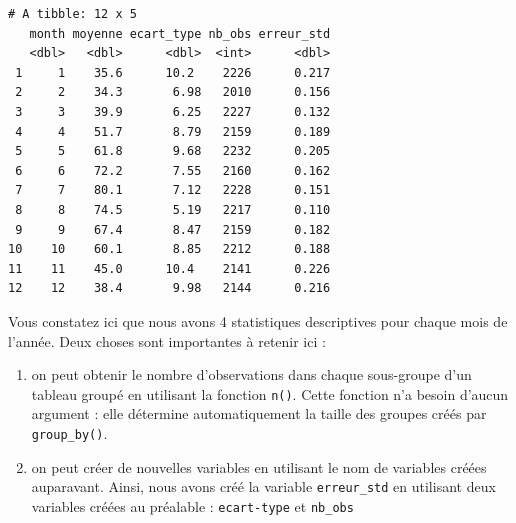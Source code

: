 \documentclass[a4paperpaper,]{article}
\newenvironment{Shaded}{\begin{snugshade}}{\end{snugshade}}
\newcommand{\DataTypeTok}[1]{\textcolor[rgb]{0.00,0.34,0.68}{#1}}
\newcommand{\KeywordTok}[1]{\textcolor[rgb]{0.12,0.11,0.11}{\textbf{#1}}}
\newcommand{\NormalTok}[1]{\textcolor[rgb]{0.12,0.11,0.11}{#1}}
\newcommand{\OperatorTok}[1]{\textcolor[rgb]{0.12,0.11,0.11}{#1}}
\newcommand{\OtherTok}[1]{\textcolor[rgb]{0.00,0.43,0.16}{#1}}
\newcommand{\StringTok}[1]{\textcolor[rgb]{0.75,0.01,0.01}{#1}}
\providecommand{\tightlist}{%
  \setlength{\itemsep}{0pt}\setlength{\parskip}{0pt}}
\begin{document}
\begin{Shaded}
\end{Shaded}

\begin{verbatim}
# A tibble: 12 x 5
   month moyenne ecart_type nb_obs erreur_std
   <dbl>   <dbl>      <dbl>  <int>      <dbl>
 1     1    35.6      10.2    2226      0.217
 2     2    34.3       6.98   2010      0.156
 3     3    39.9       6.25   2227      0.132
 4     4    51.7       8.79   2159      0.189
 5     5    61.8       9.68   2232      0.205
 6     6    72.2       7.55   2160      0.162
 7     7    80.1       7.12   2228      0.151
 8     8    74.5       5.19   2217      0.110
 9     9    67.4       8.47   2159      0.182
10    10    60.1       8.85   2212      0.188
11    11    45.0      10.4    2141      0.226
12    12    38.4       9.98   2144      0.216
\end{verbatim}

Vous constatez ici que nous avons 4 statistiques descriptives pour chaque mois de l'année. Deux choses sont importantes à retenir ici :

\begin{enumerate}
\def\labelenumi{\arabic{enumi}.}
\tightlist
\item
  on peut obtenir le nombre d'observations dans chaque sous-groupe d'un tableau groupé en utilisant la fonction \texttt{n()}. Cette fonction n'a besoin d'aucun argument : elle détermine automatiquement la taille des groupes créés par \texttt{group\_by()}.
\item
  on peut créer de nouvelles variables en utilisant le nom de variables créées auparavant. Ainsi, nous avons créé la variable \texttt{erreur\_std} en utilisant deux variables créées au préalable : \texttt{ecart-type} et \texttt{nb\_obs}
\end{enumerate}
\end{document}
